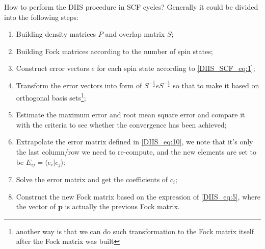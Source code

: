 How to perform the DIIS procedure in SCF cycles? Generally it could be divided into the 
following steps:
\begin{enumerate}
 \item Building density matrices $P$ and overlap matrix $S$;
 \item Building Fock matrices according to the number of spin states;
 \item Construct error vectors $e$ for each spin state according to \ref{DIIS_SCF_eq:1};
 \item Transform the error vectors into form of $S^{-\frac{1}{2}}eS^{-\frac{1}{2}}$ so that
 to make it based on orthogonal basis sets\footnote{another way is that we can do such 
 transformation to the Fock matrix itself after the Fock matrix was built};
 \item Estimate the maximum error and root mean square error and compare it with the criteria 
 to see whether the convergence has been achieved;
 \item Extrapolate the error matrix defined in \ref{DIIS_eq:10}, we note that it's only the 
 last column/row we need to re-compute, and the new elements are set to be $ E_{ij} = 
 \langle e_{i}|e_{j}\rangle$;
 \item Solve the error matrix and get the coefficients of $c_{i}$;
 \item Construct the new Fock matrix based on the expression of \ref{DIIS_eq:5}, where the 
 vector of $\mathbf{p}$ is actually the previous Fock matrix.
\end{enumerate}










